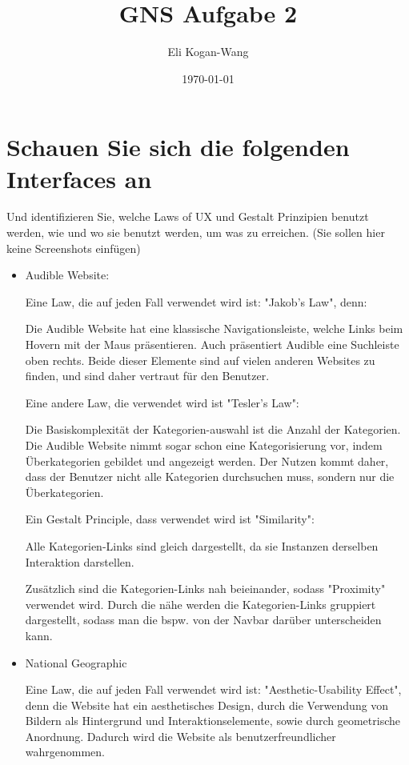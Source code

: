 \documentclass[a4paper,12pt]{article}
\title{GNS Aufgabe 2}
\author{Eli Kogan-Wang}
\date{\today}
\begin{document}

\section{Schauen Sie sich die folgenden Interfaces an}

Und identifizieren Sie, welche Laws of
UX und Gestalt Prinzipien benutzt werden, wie und wo sie benutzt werden, um was
zu erreichen. (Sie sollen hier keine Screenshots einfügen)

\begin{itemize}[label=a)]
  \item Audible Website:

        Eine Law, die auf jeden Fall verwendet wird ist: "Jakob’s Law", denn:

        Die Audible Website hat eine klassische Navigationsleiste, welche
        Links beim Hovern mit der Maus präsentieren. Auch präsentiert Audible eine Suchleiste
        oben rechts. Beide dieser Elemente sind auf vielen anderen Websites
        zu finden, und sind daher vertraut für den Benutzer.

        Eine andere Law, die verwendet wird ist "Tesler’s Law":

        Die Basiskomplexität der Kategorien-auswahl ist die Anzahl der Kategorien.
        Die Audible Website nimmt sogar schon eine Kategorisierung vor, indem
        Überkategorien gebildet und angezeigt werden. Der Nutzen kommt daher,
        dass der Benutzer nicht alle Kategorien durchsuchen muss, sondern
        nur die Überkategorien.

        Ein Gestalt Principle, dass verwendet wird ist "Similarity":

        Alle Kategorien-Links sind gleich dargestellt, da sie Instanzen
        derselben Interaktion darstellen.

        Zusätzlich sind die Kategorien-Links nah beieinander, sodass "Proximity"
        verwendet wird. Durch die nähe werden die Kategorien-Links gruppiert dargestellt,
        sodass man die bspw. von der Navbar darüber unterscheiden kann.

  \item National Geographic

        Eine Law, die auf jeden Fall verwendet wird ist: "Aesthetic-Usability Effect",
        denn die Website hat ein aesthetisches Design, durch die Verwendung von Bildern
        als Hintergrund und Interaktionselemente, sowie durch geometrische Anordnung. Dadurch
        wird die Website als benutzerfreundlicher wahrgenommen.


\end{itemize}
\end{document}
